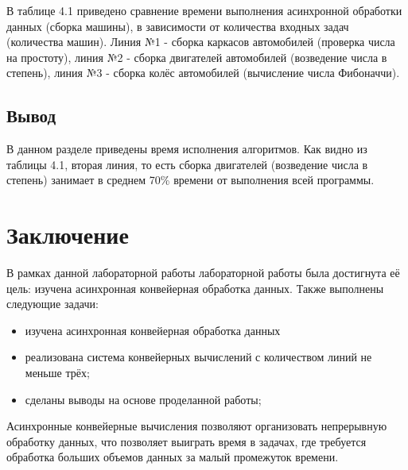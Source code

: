 \documentclass[12pt]{report}
\begin{document}
В таблице 4.1 приведено сравнение времени выполнения асинхронной обработки данных (сборка машины), в зависимости от количества входных задач (количества машин). Линия №1 - сборка каркасов автомобилей (проверка числа на простоту), линия №2 - сборка двигателей автомобилей (возведение числа в степень), линия №3 - сборка колёс автомобилей (вычисление числа Фибоначчи).

\section*{Вывод}

В данном разделе приведены время исполнения алгоритмов. Как видно из таблицы 4.1, вторая линия, то есть сборка двигателей (возведение числа в степень) занимает в среднем 70\% времени от выполнения всей программы.

\chapter*{Заключение}

В рамках данной лабораторной работы лабораторной работы была достигнута её цель: изучена асинхронная конвейерная обработка данных. Также выполнены следующие задачи:

\begin{itemize}
	\item изучена асинхронная конвейерная обработка данных
	\item реализована система конвейерных вычислений с количеством линий не меньше трёх;
	\item сделаны выводы на основе проделанной работы;
\end{itemize}

 Асинхронные конвейерные вычисления позволяют организовать непрерывную обработку данных, что позволяет выиграть время в задачах, где требуется обработка больших объемов данных за малый промежуток времени.



\end{document}
